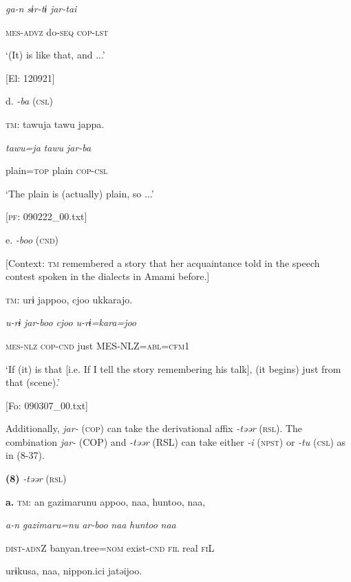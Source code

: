       \textit{ga-n}  \textit{sɨr-tɨ}  \textit{jar-tai}

      \textsc{mes}-\textsc{advz}  do-\textsc{seq}  \textsc{cop}-\textsc{lst}

      ‘(It) is like that, and ...’

      [El: 120921]

  d.  \textit{{}-ba} (\textsc{csl})

    \textsc{tm}:  tawuja  tawu  jappa.

      \textit{tawu=ja}  \textit{tawu}  \textit{jar-ba}

      plain=\textsc{top}  plain  \textsc{cop}-\textsc{csl}

      ‘The plain is (actually) plain, so ...’

      [\textsc{pf}: 090222\_00.txt]

  e.  \textit{{}-boo} (\textsc{cnd})

    [Context: \textsc{tm} remembered a story that her acquaintance told in the speech contest spoken in the dialects in Amami before.]

    \textsc{tm}:  urɨ  jappoo,  cjoo  ukkarajo.

      \textit{u-rɨ}  \textit{jar-boo}  \textit{cjoo}  \textit{u-rɨ=kara=joo}

      \textsc{mes}-\textsc{nlz}  \textsc{cop}-\textsc{cnd}  just  MES-NLZ=\textsc{abl}=\textsc{cfm}1

      ‘If (it) is that [i.e. If I tell the story remembering his talk], (it begins) just from that (scene).’

      [Fo: 090307\_00.txt]

Additionally, \textit{jar-} (\textsc{cop}) can take the derivational affix \textit{{}-təər} (\textsc{rsl}). The combination \textit{jar-} (COP) and \textit{{}-təər} (RSL) can take either \textit{{}-i} (\textsc{npst}) or \textit{{}-tu} (\textsc{csl}) as in (8-37).

\textbf{(8)}  \textit{{}-təər} (\textsc{rsl})

  \textbf{a.}  \textsc{tm}:  an  gazimarunu  appoo,  naa,  huntoo,  naa,

      \textit{a-n}  \textit{gazimaru=nu}  \textit{ar-boo}  \textit{naa}  \textit{huntoo}  \textit{naa}

      \textsc{dist}-\textsc{adn}Z  banyan.tree=\textsc{nom}  exist-\textsc{cnd}  \textsc{fil}  real  \textsc{fi}L

      urɨkusa,  naa,  {\textbar}nippon.ici{\textbar}  jatəijoo.

